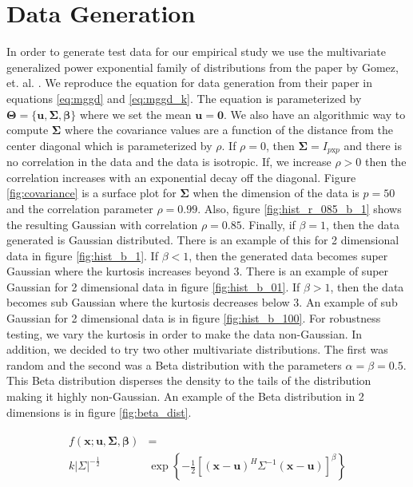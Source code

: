 \documentclass[journal]{IEEEtran}
\begin{document}
\section{Data Generation}
\par In order to generate test data for our empirical study we use the multivariate generalized power exponential family of distributions from the paper by Gomez, et. al. \cite{gomez}. We reproduce the equation for data generation from their paper in equations \ref{eq:mggd} and \ref{eq:mggd_k}. The equation is parameterized by \(\bm{\Theta} = \{\bm{u}, \bm{\Sigma}, \bm{\beta}\}\) where we set the mean \(\bm{u} = \bm{0}\). We also have an algorithmic way to compute \(\bm{\Sigma}\) where the covariance values are a function of the distance from the center diagonal which is parameterized by \(\rho\). If \(\rho = 0\), then \(\bm{\Sigma} = I_{p\text{x}p}\) and there is no correlation in the data and the data is isotropic. If, we increase \(\rho > 0\) then the correlation increases with an exponential decay off the diagonal. Figure \ref{fig:covariance} is a surface plot for \(\bm{\Sigma}\) when the dimension of the data is \(p = 50\) and the correlation parameter \(\rho = 0.99\). Also, figure \ref{fig:hist_r_085_b_1} shows the resulting Gaussian with correlation \(\rho = 0.85\). Finally, if \(\beta = 1\), then the data generated is Gaussian distributed. There is an example of this for 2 dimensional data in figure \ref{fig:hist_b_1}. If \(\beta < 1\), then the generated data becomes super Gaussian where the kurtosis increases beyond 3. There is an example of super Gaussian for 2 dimensional data in figure \ref{fig:hist_b_01}.  If \(\beta > 1\), then the data becomes sub Gaussian where the kurtosis decreases below 3. An example of sub Gaussian for 2 dimensional data is in figure \ref{fig:hist_b_100}. For robustness testing, we vary the kurtosis in order to make the data non-Gaussian. In addition, we decided to try two other multivariate distributions. The first was random and the second was a Beta distribution with the parameters \(\alpha = \beta = 0.5\). This Beta distribution disperses the density to the tails of the distribution making it highly non-Gaussian. An example of the Beta distribution in 2 dimensions is in figure \ref{fig:beta_dist}.

\begin{align}
\begin{split}
\label{eq:mggd}
f(\bm{x}; \bm{u}, \bm{\Sigma}, \bm{\beta}) &= \\
    k|\Sigma|^{-\frac{1}{2}}&\exp{\left\{-\frac{1}{2}[(\bm{x} - \bm{u})^H\Sigma^{-1}(\bm{x}-\bm{u})]^{\beta}\right\}}
\end{split}
\end{align}
\end{document}
